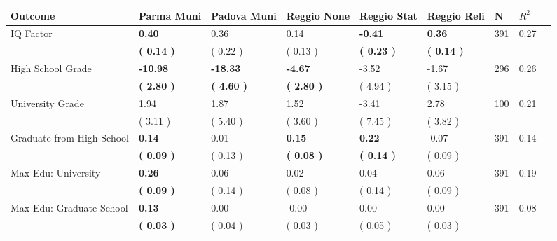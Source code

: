 \begin{tabular}{L{6.2cm} C{1.8cm} C{1.8cm} C{1.8cm} C{1.8cm} C{1.8cm} C{1.8cm} C{0.3cm} C{0.3cm}}
\toprule
 \textbf{Outcome} & \textbf{Parma Muni} & \textbf{Padova Muni} & \textbf{Reggio None} & \textbf{Reggio Stat} & \textbf{Reggio Reli} & \textbf{N} & \textbf{$ R^2$} \\
\midrule
IQ Factor & \textbf{     0.40} &      0.36 &      0.14 & \textbf{    -0.41} & \textbf{     0.36}  & 391 &       0.27 \\ 
 & \textbf{(     0.14 )} & (     0.22 ) & (     0.13 ) & \textbf{(     0.23 )} & \textbf{(     0.14 )}  & \\
High School Grade & \textbf{   -10.98} & \textbf{   -18.33} & \textbf{    -4.67} &     -3.52 &     -1.67  & 296 &       0.26 \\ 
 & \textbf{(     2.80 )} & \textbf{(     4.60 )} & \textbf{(     2.80 )} & (     4.94 ) & (     3.15 )  & \\
University Grade &      1.94 &      1.87 &      1.52 &     -3.41 &      2.78  & 100 &       0.21 \\ 
 & (     3.11 ) & (     5.40 ) & (     3.60 ) & (     7.45 ) & (     3.82 )  & \\
Graduate from High School & \textbf{     0.14} &      0.01 & \textbf{     0.15} & \textbf{     0.22} &     -0.07  & 391 &       0.14 \\ 
 & \textbf{(     0.09 )} & (     0.13 ) & \textbf{(     0.08 )} & \textbf{(     0.14 )} & (     0.09 )  & \\
Max Edu: University & \textbf{     0.26} &      0.06 &      0.02 &      0.04 &      0.06  & 391 &       0.19 \\ 
 & \textbf{(     0.09 )} & (     0.14 ) & (     0.08 ) & (     0.14 ) & (     0.09 )  & \\
Max Edu: Graduate School & \textbf{     0.13} &      0.00 &     -0.00 &      0.00 &      0.00  & 391 &       0.08 \\ 
 & \textbf{(     0.03 )} & (     0.04 ) & (     0.03 ) & (     0.05 ) & (     0.03 )  & \\
\bottomrule
\end{tabular}
